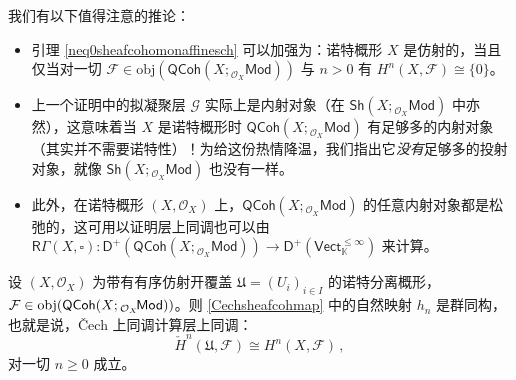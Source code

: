 \begin{Rem}\label{QCohhasenoughinjectives}
我们有以下值得注意的推论：
\begin{itemize}[leftmargin=0.5cm]
	\item 引理 \ref{neq0sheafcohomonaffinesch} 可以加强为：诺特概形 $X$ 是仿射的，当且仅当对一切 $\mathcal{F}\in\text{obj}(\mathsf{QCoh}(X;{}_{\mathcal{O}_X}\!\mathsf{Mod}))$ 与 $n>0$ 有 $H^n(X,\mathcal{F})\cong \{0\}$。
	
	\item 上一个证明中的拟凝聚层 $\mathcal{G}$ 实际上是内射对象（在 $\mathsf{Sh}(X;{}_{\mathcal{O}_X}\!\mathsf{Mod})$ 中亦然），这意味着当 $X$ 是诺特概形时 $\mathsf{QCoh}(X;{}_{\mathcal{O}_X}\!\mathsf{Mod})$ 有足够多的内射对象（其实并不需要诺特性）！为给这份热情降温，我们指出它\textit{没有}足够多的投射对象，就像 $\mathsf{Sh}(X;{}_{\mathcal{O}_X}\!\mathsf{Mod})$ 也没有一样。
	
	\item 此外，在诺特概形 $(X,\mathcal{O}_X)$ 上，$\mathsf{QCoh}(X;{}_{\mathcal{O}_X}\!\mathsf{Mod})$ 的任意内射对象都是松弛的，这可用以证明层上同调也可以由 $\mathsf{R}\Gamma(X,\square):\mathsf{D^+}(\mathsf{QCoh}(X;{}_{\mathcal{O}_X}\!\mathsf{Mod}))\rightarrow \mathsf{D^+}(\mathsf{Vect}_\mathbb{K}^{\leq\infty})$ 来计算。  
\end{itemize}
\end{Rem}

\begin{Thm}\label{sheafcohomthroughCech}
设 $(X,\mathcal{O}_X)$ 为带有有序仿射开覆盖 $\mathfrak{U}=(U_i)_{i\in I}$ 的诺特分离概形，$\mathcal{F}\in\textup{obj}(\mathsf{QCoh}(X;{}_{\mathcal{O}_X}\!\mathsf{Mod}))$。则 \eqref{Cechsheafcohmap} 中的自然映射 $h_n$ 是群同构，也就是说，\v{C}ech 上同调计算层上同调：
\begin{equation}
	\check{H}^n(\mathfrak{U},\mathcal{F})\cong H^n(X,\mathcal{F})\,,
\end{equation}
对一切 $n\geq 0$ 成立。
\end{Thm}

